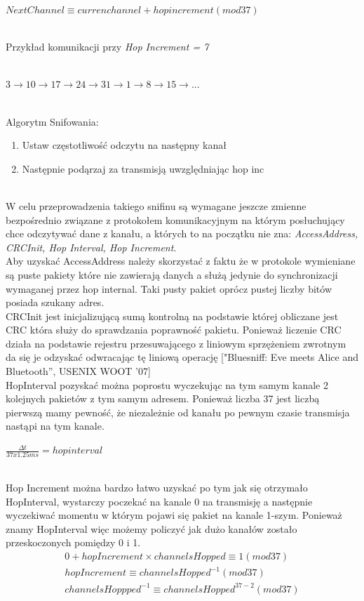 \centerline{ $ NextChannel \equiv curren channel + hop increment (mod 37) $ } 
\mbox{}\\
Przykład komunikacji przy \textit{Hop Increment = 7} 
\mbox{}\\
\mbox{}\\
\centerline{ $ 3 \to 10 \to 17 \to 24 \to 31 \to 1 \to 8 \to 15 \to ... $ } 
\mbox{}\\
Algorytm Snifowania: 
	\begin{enumerate}
\item Ustaw częstotliwość odczytu na następny kanał
\item Następnie podąrzaj za transmisją uwzględniając hop inc
\end{enumerate} 
\mbox{}\\
\tab W celu przeprowadzenia takiego snifinu są wymagane jeszcze zmienne bezpośrednio związane z protokołem komunikacyjnym na którym posłuchujący chce odczytywać dane z kanału, a których to na początku nie zna: \textit{AccessAddress, CRCInit, Hop Interval, Hop Increment}. \\
Aby uzyskać AccessAddress należy skorzystać z faktu że w protokole wymieniane są puste pakiety które nie zawierają danych a służą jedynie do synchronizacji wymaganej przez hop internal. Taki pusty pakiet oprócz pustej liczby bitów posiada szukany adres. \\
CRCInit jest inicjalizującą sumą kontrolną na podstawie której obliczane jest CRC która służy do sprawdzania poprawność pakietu. Ponieważ liczenie CRC działa na podstawie rejestru przesuwającego z liniowym sprzężeniem zwrotnym da się je odzyskać odwracając tę liniową operację ["Bluesniff: Eve meets Alice and Bluetooth”, USENIX WOOT '07] \\
\tab HopInterval pozyskać można poprostu wyczekując na tym samym kanale 2 kolejnych pakietów z tym samym adresem. Ponieważ liczba 37 jest liczbą pierwszą mamy pewność, że niezależnie od kanału po pewnym czasie transmisja nastąpi na tym kanale.

\centerline{ $ \frac{\Delta t}{37 x 1.25 ms} = hop interval $ }
\mbox{}\\
Hop Increment można bardzo łatwo uzyskać po tym jak się otrzymało HopInterval, wystarczy poczekać na kanale 0 na transmisję a następnie wyczekiwać momentu w którym pojawi się pakiet na kanale 1-szym.
Ponieważ znamy HopInterval więc możemy policzyć jak dużo kanałów zostało przeskoczonych pomiędzy 0 i 1.
\mbox{}\\

\begin{gather*}
        0 + hopIncrement × channelsHopped  \equiv 1 (mod 37)\\
        hopIncrement \equiv  channelsHopped^{-1} (mod 37) \\
        channelsHoppped^{-1} \equiv channelsHopped^{37-2} (mod 37)
\end{gather*}


